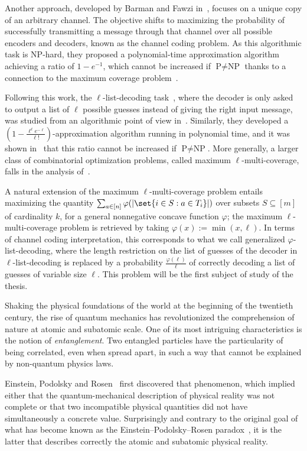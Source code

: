 Another approach, developed by Barman and Fawzi in~\cite{BF18}, focuses on a unique copy of an arbitrary channel. The objective shifts to maximizing the probability of successfully transmitting a message through that channel over all possible encoders and decoders, known as the channel coding problem. As this algorithmic task is \textrm{NP}-hard, they proposed a polynomial-time approximation algorithm achieving a ratio of $1-e^{-1}$, which cannot be increased if $\textrm{P}\not=\textrm{NP}$ thanks to a connection to the maximum coverage problem~\cite{Feige02}.

Following this work, the $\ell$-list-decoding task~\cite{Elias57,Wozencraft58}, where the decoder is only asked to output a list of $\ell$ possible guesses instead of giving the right input message, was studied from an algorithmic point of view in~\cite{BFGG20}. Similarly, they developed a $\left(1-\frac{\ell^{\ell}e^{-\ell}}{\ell!}\right)$-approximation algorithm running in polynomial time, and it was shown in~\cite{DMMS20} that this ratio cannot be increased if $\textrm{P}\not=\textrm{NP}$. More generally, a larger class of combinatorial optimization problems, called maximum $\ell$-multi-coverage, falls in the analysis of~\cite{BFGG20}.

A natural extension of the maximum $\ell$-multi-coverage problem entails maximizing the quantity $\sum_{a \in [n]}  \varphi(\abs{\set{i \in S : a \in T_i}})$ over subsets $S \subseteq [m]$ of cardinality $k$, for a general nonnegative concave function $\varphi$; the  maximum $\ell$-multi-coverage problem is retrieved by taking $\varphi(x) := \min(x,\ell)$. In terms of channel coding interpretation, this corresponds to what we call generalized $\varphi$-list-decoding, where the length restriction on the list of guesses of the decoder in $\ell$-list-decoding is replaced by a probability $\frac{\varphi(\ell)}{\ell}$ of correctly decoding a list of guesses of variable size $\ell$. This problem will be the first subject of study of the thesis.

Shaking the physical foundations of the world at the beginning of the twentieth century, the rise of quantum mechanics has revolutionized the comprehension of nature at atomic and subatomic scale. One of its most intriguing characteristics is the notion of \emph{entanglement}. Two entangled particles have the particularity of being correlated, even when spread apart, in such a way that cannot be explained by non-quantum physics laws.

Einstein, Podolsky and Rosen~\cite{EPR35} first discovered that phenomenon, which implied either that the quantum-mechanical description of physical reality was not complete or that two incompatible physical quantities did not have simultaneously a concrete value. Surprisingly and contrary to the original goal of what has become known as the Einstein–Podolsky–Rosen paradox~\cite{EPR35}, it is the latter that describes correctly the atomic and subatomic physical reality.

